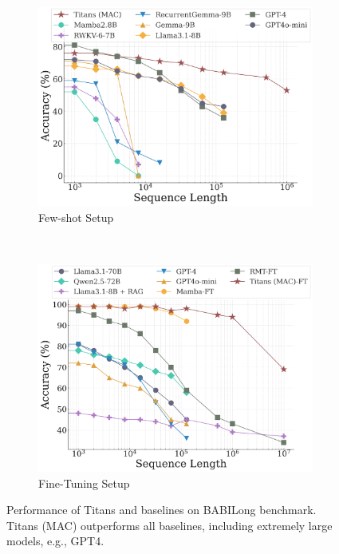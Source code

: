 \begin{figure}[t!]
    \centering
    \begin{subfigure}{0.33\linewidth}
        \includegraphics[width=\linewidth]{Figures/BABILong-few-shot.png}
    \caption{Few-shot Setup}
    \label{fig:babilong-zero-shot}
    \end{subfigure}~
    \centering~\hspace{4ex}
    \begin{subfigure}{0.33\linewidth}
        \includegraphics[width=\linewidth]{Figures/BABILong-FT.png}
    \caption{Fine-Tuning Setup}
    \label{fig:babilong-fine-tune}
    \end{subfigure}
    \caption{Performance of Titans and baselines on BABILong benchmark. Titans (MAC) outperforms all baselines, including extremely large models, e.g., GPT4.}
    \vspace{-2ex}
\end{figure}



